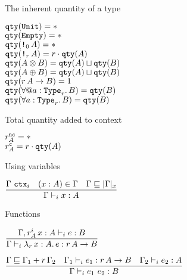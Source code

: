 \begin{frame}{The inherent quantity of a type}

\begin{center}
  $\texttt{qty}(\texttt{Unit}) = *$ \\
  $\texttt{qty}(\texttt{Empty}) = *$ \\
  $\typeqty{\Box[\Zero]{A}} = \Any$ \\
  $\typeqty{\Box[r]{A}} = \mulqty{r}{\typeqty{A}}$ \\
  $\texttt{qty}(A \otimes B) = \texttt{qty}(A) \sqcup \texttt{qty}(B)$ \\
  $\texttt{qty}(A \oplus B) = \texttt{qty}(A) \sqcup \texttt{qty}(B)$ \\
  $\typeqty{\Fun[r]{A}{B}} = \One$ \\
  $\typeqty{\ForallE{a}[r]{B}} = \typeqty{B}$ \\
  $\typeqty{\ForallI{a}[r]{B}} = \typeqty{B}$ \\
\end{center}

\end{frame}

\begin{frame}{Total quantity added to context}

\begin{center}
  $\totalqty{r}{A}[\noncomputable] = \Any$ \\
  $\totalqty{r}{A}[\computable] = \mulqty{r}{\typeqty{A}}$
\end{center}

\end{frame}

\begin{frame}{Using variables}

\begin{center}
  $\infrule{\ctx{\Gamma} \quad (x : A) \in \Gamma \quad \subusagectx{\Gamma}{\varctx{\Gamma}{x}}}{\typing[\Gamma]{x}{A}}$
\end{center}

\end{frame}

\begin{frame}{Functions}

\begin{center}
  $\infrule{\typing[\extend{\Gamma}[\totalqty{r}{A}]{x}{A}]{e}{B}}{\typing[\Gamma]{\fun[r]{x}[A]{e}}{\Fun[r]{A}{B}}}$

  \vspace{2em}

  $\infrule{\subusagectx{\Gamma}{\addctx{\Gamma_1}{\scalectx{r}{\Gamma_2}}} \quad \typing[\Gamma_1]{e_1}{\Fun[r]{A}{B}} \quad \typing[\Gamma_2]{e_2}{A}}{\typing[\Gamma]{\app{e_1}{e_2}}{B}}$
\end{center}

\end{frame}

